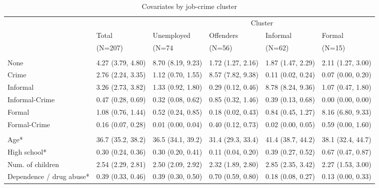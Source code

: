 
\renewcommand{\arraystretch}{0.8}
\begin{scriptsize}
{\setlength{\tabcolsep}{5pt}
\begin{longtable}{llllll} 
\caption{Covariates by job-crime cluster}%
 \label{tab:desc_job_crime_clusters}\\
\hline
\addlinespace
& & \multicolumn{4}{c}{Cluster} \\
\addlinespace
\cmidrule(lr){3-6} 
\addlinespace
& \multicolumn{1}{l}{Total} & \multicolumn{1}{l}{Unemployed} & \multicolumn{1}{l}{Offenders} & \multicolumn{1}{l}{Informal} & \multicolumn{1}{l}{Formal} \\& \multicolumn{1}{l}{(N=207)} & \multicolumn{1}{l}{(N=74} 
        & \multicolumn{1}{l}{(N=56)} & \multicolumn{1}{l}{(N=62)} 
        & \multicolumn{1}{l}{(N=15)} \\\addlinespace[8pt]
\hline
\addlinespace[12pt]
\multicolumn{6}{l}{\textbf{Time spent on job (months)}} \\
\addlinespace\quad None & 4.27 (3.79, 4.80) & 8.70 (8.19, 9.23) & 1.72 (1.27, 2.16) & 1.87 (1.47, 2.29) & 2.11 (1.27, 3.00) \\ 
  \quad Crime & 2.76 (2.24, 3.35) & 1.12 (0.70, 1.55) & 8.57 (7.82, 9.38) & 0.11 (0.02, 0.24) & 0.07 (0.00, 0.20) \\ 
  \quad Informal & 3.26 (2.73, 3.82) & 1.33 (0.92, 1.80) & 0.29 (0.12, 0.46) & 8.78 (8.24, 9.36) & 1.07 (0.47, 1.80) \\ 
  \quad Informal-Crime & 0.47 (0.28, 0.69) & 0.32 (0.08, 0.62) & 0.85 (0.32, 1.46) & 0.39 (0.13, 0.68) & 0.00 (0.00, 0.00) \\ 
  \quad Formal & 1.08 (0.76, 1.44) & 0.52 (0.24, 0.85) & 0.18 (0.02, 0.43) & 0.84 (0.45, 1.27) & 8.16 (6.80, 9.33) \\ 
  \quad Formal-Crime & 0.16 (0.07, 0.28) & 0.01 (0.00, 0.04) & 0.40 (0.12, 0.73) & 0.02 (0.00, 0.05) & 0.59 (0.00, 1.60) \\ 
  \addlinespace[12pt]
\multicolumn{6}{l}{\textbf{Covariates (average)*}} \\
\addlinespace
\quad Age* & 36.7 (35.2, 38.2) & 36.5 (34.1, 39.2) & 31.4 (29.3, 33.4) & 41.4 (38.7, 44.2) & 38.1 (32.4, 44.7) \\ 
  \quad High school* & 0.30 (0.24, 0.36) & 0.30 (0.20, 0.41) & 0.11 (0.04, 0.20) & 0.39 (0.27, 0.52) & 0.67 (0.47, 0.87) \\ 
  \quad Num. of children & 2.54 (2.29, 2.81) & 2.50 (2.09, 2.92) & 2.32 (1.89, 2.80) & 2.85 (2.35, 3.42) & 2.27 (1.53, 3.00) \\ 
  \quad Dependence / drug abuse* & 0.39 (0.33, 0.46) & 0.39 (0.30, 0.50) & 0.70 (0.59, 0.80) & 0.18 (0.08, 0.27) & 0.13 (0.00, 0.33) \\ 

\end{longtable}}
\end{scriptsize}
